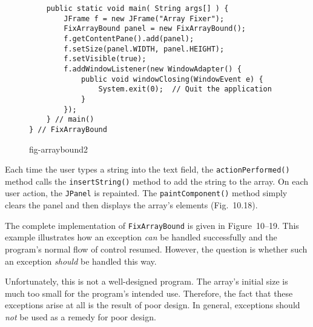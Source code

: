 \begin{figure}[tb]
\addtocounter{figure}{-1}
\jjjprogstart
\begin{jjjlisting}
\begin{lstlisting}
    public static void main( String args[] ) {
        JFrame f = new JFrame("Array Fixer");
        FixArrayBound panel = new FixArrayBound();
        f.getContentPane().add(panel);
        f.setSize(panel.WIDTH, panel.HEIGHT);
        f.setVisible(true);
        f.addWindowListener(new WindowAdapter() { 
            public void windowClosing(WindowEvent e) {
                System.exit(0);  // Quit the application
            }
        });
    } // main()
} // FixArrayBound
\end{lstlisting}
\end{jjjlisting}
{fig-arraybound2}
\end{figure}



Each time the user types a string into the text field, the
{\tt action\-Performed()} method calls the {\tt insertString()} method to add
the string to the array.  On each user action, the {\tt JPanel} is
repainted.  The {\tt paintComponent()} method simply clears the panel
and then displays the array's elements
(Fig.~10.18).


The complete implementation of {\tt FixArrayBound} is given in Figure~10\mbox{--}19.
This example illustrates how an exception {\it can} be handled
successfully and the program's normal flow of control
resumed.  However, the question is whether such an exception {\it
should} be handled this way.

Unfortunately, this is not a well-designed program.  The array's
initial size is much too small for the program's intended
use.  Therefore, the fact that these exceptions arise at all is the
result of poor design.  In general, exceptions should {\it not} be used
as a remedy for poor design.



